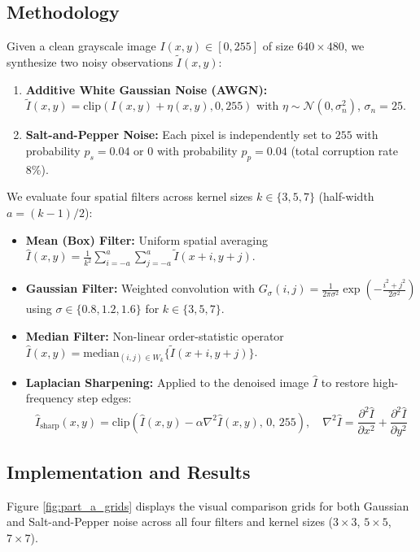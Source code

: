 \documentclass[a4paper,12pt]{article}
\begin{document}
\subsection{Methodology}
Given a clean grayscale image $I(x,y) \in [0,255]$ of size $640\times 480$, we synthesize two noisy observations $\tilde{I}(x,y)$:
\begin{enumerate}
    \item \textbf{Additive White Gaussian Noise (AWGN):} $\tilde{I}(x,y) = \text{clip}(I(x,y) + \eta(x,y), 0, 255)$ with $\eta \sim \mathcal{N}(0, \sigma_n^2)$, $\sigma_n = 25$.
    \item \textbf{Salt-and-Pepper Noise:} Each pixel is independently set to $255$ with probability $p_s = 0.04$ or $0$ with probability $p_p = 0.04$ (total corruption rate $8\%$).
\end{enumerate}
We evaluate four spatial filters across kernel sizes $k \in \{3, 5, 7\}$ (half-width $a = (k-1)/2$):
\begin{itemize}
    \item \textbf{Mean (Box) Filter:} Uniform spatial averaging $\hat{I}(x,y) = \frac{1}{k^2}\sum_{i=-a}^{a}\sum_{j=-a}^{a}\tilde{I}(x+i,y+j)$.
    \item \textbf{Gaussian Filter:} Weighted convolution with $G_\sigma(i,j) = \frac{1}{2\pi\sigma^2}\exp\left(-\frac{i^2+j^2}{2\sigma^2}\right)$ using $\sigma \in \{0.8, 1.2, 1.6\}$ for $k \in \{3,5,7\}$.
    \item \textbf{Median Filter:} Non-linear order-statistic operator $\hat{I}(x,y) = \text{median}_{(i,j)\in W_k}\{\tilde{I}(x+i,y+j)\}$.
    \item \textbf{Laplacian Sharpening:} Applied to the denoised image $\hat{I}$ to restore high-frequency step edges:
    $$\hat{I}_{\text{sharp}}(x,y) = \text{clip}\left(\hat{I}(x,y) - \alpha \nabla^2 \hat{I}(x,y),\, 0,\, 255\right), \quad \nabla^2 \hat{I} = \frac{\partial^2 \hat{I}}{\partial x^2} + \frac{\partial^2 \hat{I}}{\partial y^2}$$
\end{itemize}

\subsection{Implementation and Results}
Figure \ref{fig:part_a_grids} displays the visual comparison grids for both Gaussian and Salt-and-Pepper noise across all four filters and kernel sizes ($3\times 3$, $5\times 5$, $7\times 7$).
\end{document}
